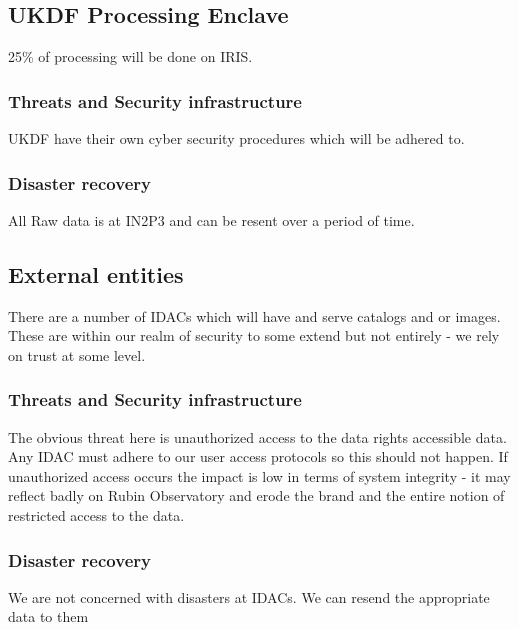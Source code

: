 \subsection{UKDF Processing  \gls{Enclave}}
25\% of processing will be done on \gls{IRIS}.
\subsubsection{Threats and Security infrastructure}
UKDF have their own cyber security procedures which will be adhered to.
\subsubsection{Disaster recovery}
All Raw data is at IN2P3 and can be resent over a period of time.


\subsection{External entities}
There are a number of \gls{IDAC}s which will have and serve catalogs and or images.
These are within our realm of security to some extend but not entirely - we rely on trust at some level.
\subsubsection{Threats and Security infrastructure}
The obvious threat here is unauthorized access to the data rights accessible data.
Any IDAC must adhere to our user access protocols so this should not happen.
If unauthorized access occurs the impact is low in terms of system integrity - it may reflect badly on Rubin Observatory and erode the brand and the entire notion of restricted access to the data.

\subsubsection{Disaster recovery}
We are not concerned with disasters at IDACs.
We can resend the appropriate data to them

